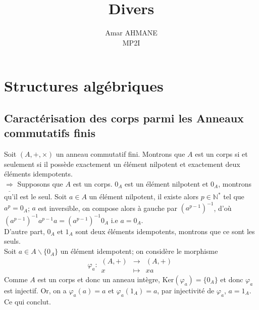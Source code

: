 \documentclass[17pt]{article}
\title{Divers}
\author{Amar AHMANE\\ MP2I}
\def\N{\mathbb N}
\def\implique{\Longrightarrow}
\def\Ker{\text{Ker}}
\begin{document}
	\maketitle
	
	\section*{Structures algébriques}
	\subsection*{Caractérisation des corps parmi les Anneaux commutatifs finis}
	Soit $(A, +, \times)$ un anneau commutatif fini. Montrons que $A$ est un corps si et seulement si il possède exactement un élément nilpotent et exactement deux éléments idempotents.\\


	$\underline{\implique}$ Supposons que $A$ est un corps. $0_A$ est un élément nilpotent et $0_A$, montrons qu'il est le seul. Soit $a\in A$ un élément nilpotent, il existe alors $p\in\N^*$ tel que $a^p=0_A$; $a$ est inversible, on compose alors à gauche par $(a^{p-1})^{-1}$, d'où $(a^{p-1})^{-1}a^{p-1}a=(a^{p-1})^{-1}0_A$ i.e $a=0_A$.\\
	D'autre part, $0_A$ et $1_A$ sont deux éléments idempotents, montrons que ce sont les seuls.\\
	Soit $a\in A\backslash\lbrace 0_A\rbrace$ un élément idempotent; on considère le morphisme \[\varphi_a:\begin{array}{ccc} (A,+)&\to&(A,+)\\x&\mapsto&xa\end{array}\]
	Comme $A$ est un corps et donc un anneau intègre, $\Ker(\varphi_a)=\lbrace 0_A\rbrace$ et donc $\varphi_a$ est injectif. Or, on a $\varphi_a(a)=a$ et $\varphi_a(1_A)=a$, par injectivité de $\varphi_a$, $a=1_A$. Ce qui conclut.\\
\end{document}
